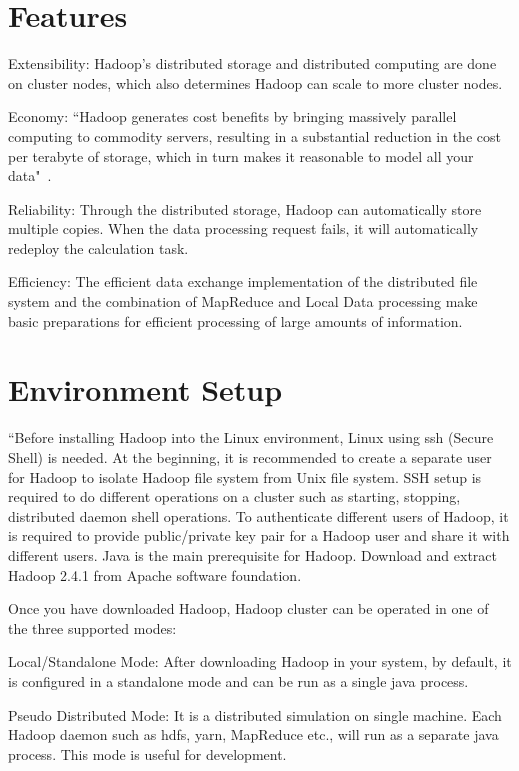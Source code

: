 \section{Features}
Extensibility: Hadoop's distributed storage and distributed computing are done on 
cluster nodes, which also determines Hadoop can scale to more cluster nodes.

Economy: ``Hadoop generates cost benefits by bringing massively parallel computing 
to commodity servers, resulting in a substantial reduction in the cost per terabyte 
of storage, which in turn makes it reasonable to model all your data"~\cite{hid-sp18-508-features}.

Reliability: Through the distributed storage, Hadoop can automatically store multiple 
copies. When the data processing request fails, it will automatically redeploy the 
calculation task.

Efficiency: The efficient data exchange implementation of the distributed file system 
and the combination of MapReduce and Local Data processing make basic preparations 
for efficient processing of large amounts of information.


\section{Environment Setup}
``Before installing Hadoop into the Linux environment,  Linux using ssh (Secure Shell) 
is needed. At the beginning, it is recommended to create a separate user for Hadoop 
to isolate Hadoop file system from Unix file system. SSH setup is required to do 
different operations on a cluster such as starting, stopping, distributed daemon 
shell operations. To authenticate different users of Hadoop, it is required to 
provide public/private key pair for a Hadoop user and share it with different 
users. Java is the main prerequisite for Hadoop. Download and extract Hadoop 2.4.1 
from Apache software foundation. 

Once you have downloaded Hadoop, Hadoop cluster can be operated in one of the 
three supported modes:

Local/Standalone Mode: After downloading Hadoop in your system, by default, 
it is configured in a standalone mode and can be run as a single java process.

Pseudo Distributed Mode: It is a distributed simulation on single machine. 
Each Hadoop daemon such as hdfs, yarn, MapReduce etc., will run as a separate 
java process. This mode is useful for development.

